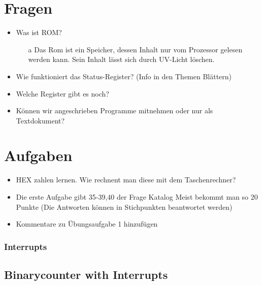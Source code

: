\documentclass[
  ngerman
  ,12pt
  ,pdftex
]{article}
\begin{document}
  \section{Fragen}
  \begin{itemize}
    \item Was ist ROM?
    \begin{itemize}
      \item [a] Das Rom ist ein Speicher, dessen Inhalt nur vom Prozessor gelesen werden kann. Sein Inhalt lässt sich durch UV-Licht löschen.
    \end{itemize}
    \item Wie funktioniert das Status-Register? (Info in den Themen Blättern)
    \item Welche Register gibt es noch?
    \item Können wir angeschrieben Programme mitnehmen oder nur als Textdokument?
  \end{itemize}
  \section{Aufgaben}
  \begin{itemize}
    \item HEX zahlen lernen. Wie rechnent man diese mit dem Taschenrechner?
    \item Die erste Aufgabe gibt 35-39,40 der Frage Katalog
    Meist bekommt man so 20 Punkte (Die Antworten können in Stichpunkten beantwortet werden)
    \item Kommentare zu Übungsaufgabe 1 hinzufügen
  \end{itemize}


\newpage












\subsubsection*{Interrupts}

\subsection*{Binarycounter with Interrupts}

\end{document}

